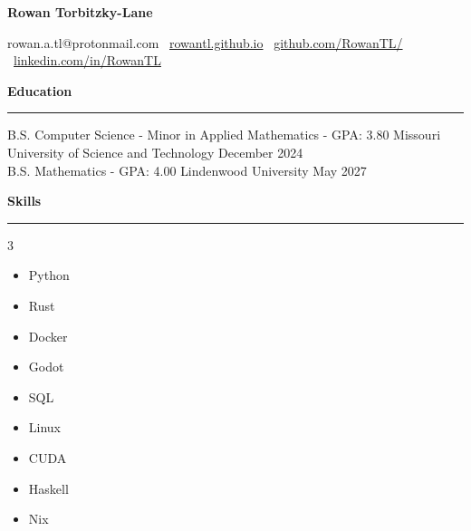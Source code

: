 \documentclass[11pt]{article}
\begin{document}
\begin{center}
    \textbf{\huge Rowan Torbitzky-Lane}\\
    \hrulefill
\end{center}

\begin{center}
    rowan.a.tl@protonmail.com \textbullet \ \href{https://rowantl.github.io/}{rowantl.github.io} \textbullet \ \href{https://github.com/RowanTL}{github.com/RowanTL/} \textbullet  \ \href{https://www.linkedin.com/in/rowantl/}{linkedin.com/in/RowanTL}
\end{center}

\textbf{Education}\par
\vspace{-12pt}
\noindent\rule{\textwidth}{0.4pt}

B.S. Computer Science - Minor in Applied Mathematics - GPA: 3.80 \tiny{Missouri University of Science and Technology} \hfill \normalsize{December 2024} \\
B.S. Mathematics - GPA: 4.00 \tiny{Lindenwood University} \hfill \normalsize{May 2027}

\textbf{Skills}\par
\vspace{-12pt}
\noindent\rule{\textwidth}{0.4pt}
\vspace{-24pt}  %
\begin{multicols}{3}
    \begin{itemize}[noitemsep, topsep=0pt, partopsep=0pt, parsep=0pt, itemsep=0pt]
        \small
        \item Python
        \item Rust
        \item Docker
        \item Godot
        \item SQL
        \item Linux
        \item CUDA
        \item Haskell
        \item Nix
    \end{itemize}
\end{multicols}
\vspace{-10pt}  %
\end{document}
